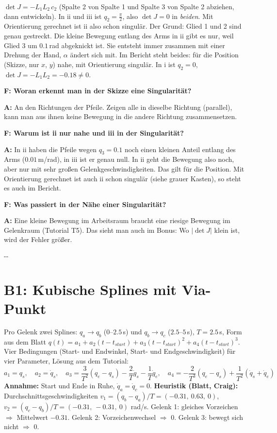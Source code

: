\documentclass[10pt,a4paper]{article}
\makeatletter
\newcommand{\secneed}[1]{\par\penalty\@M\begingroup\setlength{\dimen@}{#1}\dimen@ii\pagegoal
  \advance\dimen@ii-\pagetotal\ifdim\dimen@>\dimen@ii\ifdim\dimen@ii>\z@\vfil\fi\penalty-\@M\fi\endgroup}
\let\oldsection\section
\renewcommand{\section}{\secneed{9\baselineskip}\oldsection}
\newcommand{\frage}[2]{\textbf{F: #1}\par\nopagebreak\vspace{1pt}\textbf{A:} #2\par\vspace{5pt}}
\makeatother
\begin{document}
\begin{extra}
$\det J = -L_1 L_2\, c_2$ (Spalte 2 von Spalte 1 und Spalte 3 von Spalte 2 abziehen, dann entwickeln). In ii und iii ist
$q_2 = \frac{\pi}{2}$, also $\det J = 0$ in \emph{beiden}. Mit Orientierung gerechnet ist ii also schon singulär. Der
Grund: Glied 1 und 2 sind genau gestreckt. Die kleine Bewegung entlang des Arms in ii gibt es nur, weil Glied 3 um $0.1$\,rad abgeknickt ist. Sie entsteht immer zusammen mit einer Drehung der Hand, $\alpha$ ändert sich mit.
Im Bericht steht beides: für die Position (Skizze, nur $x$, $y$) \glqq nahe\grqq, mit Orientierung \glqq singulär\grqq. In i ist $q_2 = 0$, $\det J = -L_1 L_2 = -0.18 \ne 0$.
\end{extra}

\begin{fragen}
\frage{Woran erkennt man in der Skizze eine Singularität?}
{An den Richtungen der Pfeile. Zeigen alle in dieselbe Richtung (parallel), kann man aus ihnen keine Bewegung in die
andere Richtung zusammensetzen.}
\frage{Warum ist ii nur \glqq nahe\grqq{} und iii \glqq in\grqq{} der Singularität?}
{In ii haben die Pfeile wegen $q_3 = 0.1$ noch einen kleinen Anteil entlang des Arms ($0.01$\,m/rad), in iii ist er genau
null. In ii geht die Bewegung also noch, aber nur mit sehr großen Gelenkgeschwindigkeiten. Das gilt für die Position. Mit Orientierung gerechnet ist auch ii schon singulär (siehe grauer Kasten), so steht es auch im Bericht.}
\frage{Was passiert in der Nähe einer Singularität?}
{Eine kleine Bewegung im Arbeitsraum braucht eine riesige Bewegung im Gelenkraum (Tutorial T5). Das sieht man auch im
Bonus: Wo $|\det J|$ klein ist, wird der Fehler größer.}
\end{fragen}

\section{B1: Kubische Splines mit Via-Punkt}

Pro Gelenk zwei Splines: $q_a \to q_b$ ($0$--$2.5$\,s) und $q_b \to q_c$ ($2.5$--$5$\,s), $T = 2.5$\,s, Form aus dem Blatt
$q(t) = a_1 + a_2 (t - t_{start}) + a_3 (t - t_{start})^2 + a_4 (t - t_{start})^3$. Vier Bedingungen (Start- und Endwinkel,
Start- und Endgeschwindigkeit) für vier Parameter, Lösung aus dem Tutorial:
\[
  a_1 = q_s,\quad a_2 = \dot q_s,\quad
  a_3 = \frac{3}{T^2}(q_e - q_s) - \frac{2}{T}\dot q_s - \frac{1}{T}\dot q_e,\quad
  a_4 = -\frac{2}{T^3}(q_e - q_s) + \frac{1}{T^2}(\dot q_s + \dot q_e)
\]
\textbf{Annahme:} Start und Ende in Ruhe, $\dot q_a = \dot q_c = 0$. \textbf{Heuristik (Blatt, Craig):} Durchschnitts\-geschwindigkeiten
$v_1 = (q_b - q_a)/T = (-0.31,\ 0.63,\ 0)$, $v_2 = (q_c - q_b)/T = (-0.31,\ -0.31,\ 0)$ rad/s.
Gelenk 1: gleiches Vorzeichen $\Rightarrow$ Mittelwert $-0.31$. Gelenk 2: Vorzeichenwechsel $\Rightarrow$ 0. Gelenk 3:
bewegt sich nicht $\Rightarrow$ 0.
\end{document}
